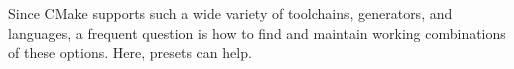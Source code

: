 Since CMake supports such a wide variety of toolchains, generators, and languages, a frequent question is how to find and maintain working combinations of these options. Here, presets can help.



































